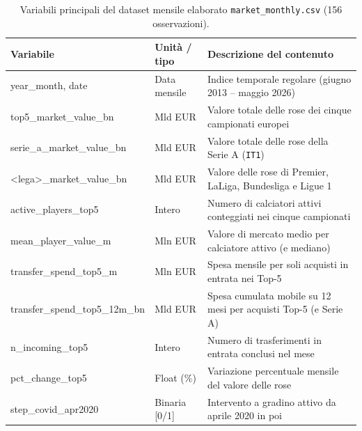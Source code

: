\begin{table}[!htbp]
\centering
\small
\setlength{\tabcolsep}{4.5pt}
\caption{Variabili principali del dataset mensile elaborato \texttt{market\_monthly.csv} (156 osservazioni).}
\label{tab:schema_market_monthly}
\vspace{0.2cm}
\begin{tabularx}{\textwidth}{>{\ttfamily\small}p{5.45cm}p{2.1cm}X}
\toprule
\textbf{\rmfamily Variabile} & \textbf{Unità / tipo} & \textbf{Descrizione del contenuto} \\
\midrule
year\_month, date & Data mensile & Indice temporale regolare (giugno 2013 -- maggio 2026) \\
top5\_market\_value\_bn & Mld EUR & Valore totale delle rose dei cinque campionati europei \\
serie\_a\_market\_value\_bn & Mld EUR & Valore totale delle rose della Serie A (\texttt{IT1}) \\
<lega>\_market\_value\_bn & Mld EUR & Valore delle rose di Premier, LaLiga, Bundesliga e Ligue 1 \\
active\_players\_top5 & Intero & Numero di calciatori attivi conteggiati nei cinque campionati \\
mean\_player\_value\_m & Mln EUR & Valore di mercato medio per calciatore attivo (e mediano) \\
transfer\_spend\_top5\_m & Mln EUR & Spesa mensile per soli acquisti in entrata nei Top-5 \\
transfer\_spend\_top5\_12m\_bn & Mld EUR & Spesa cumulata mobile su 12 mesi per acquisti Top-5 (e Serie A) \\
n\_incoming\_top5 & Intero & Numero di trasferimenti in entrata conclusi nel mese \\
pct\_change\_top5 & Float (\%) & Variazione percentuale mensile del valore delle rose \\
step\_covid\_apr2020 & Binaria [0/1] & Intervento a gradino attivo da aprile 2020 in poi \\
\bottomrule
\end{tabularx}
\end{table}
